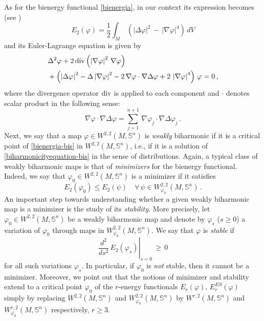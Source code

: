 \documentclass[11pt]{amsart}
\theoremstyle{plain}
\theoremstyle{definition}
\numberwithin{equation}{section}
\def \s{{\mathbb S}}
\numberwithin{equation}{section}
\begin{document}
As for the bienergy functional \eqref{bienergia}, in our context its expression becomes (see \cite{Baird, FS, Saliba})
\begin{equation}\label{bienergia-bis}
    E_2(\varphi)=\frac{1}{2}\int_{M}\,\left (\left |\Delta \varphi \right |^2\,-\,\left |\nabla \varphi \right |^4 \right )\,dV
\end{equation}
and its Euler-Lagrange equation is given by
\begin{equation}\label{biharmonicityequation-bis}
\begin{split}
  &\Delta^2 \varphi +2\,{\rm div} \left ( \left | \nabla \varphi \right |^2\,\nabla \varphi \right ) \\
  &+ \left (\left |\Delta \varphi \right |^2-\Delta \left |\nabla \varphi \right |^2 -2\, \nabla \varphi \cdot  \nabla \Delta \varphi +2\,\left |\nabla \varphi \right |^4\right )\, \varphi =0 \,,
\end{split}
\end{equation}
where the divergence operator ${\rm div}$ is applied to each component and $\cdot$ denotes scalar product in the following sense:
\[
\nabla \varphi \cdot  \nabla \Delta \varphi= \sum_{j=1}^{n+1}\,\nabla \varphi_j \cdot  \nabla \Delta \varphi_j \, .
\]
Next, we say that a map $\varphi \in W^{2,2}\left ( M,\s^n \right )$ is \textit{weakly} biharmonic  if it is a critical point of \eqref{bienergia-bis} in $W^{2,2}\left ( M,\s^n \right )$, i.e., if it is a solution of \eqref{biharmonicityequation-bis} in the sense of distributions. 
Again, a typical class of weakly biharmonic maps is that of {\it minimizers} for the bienergy functional.
Indeed, we say that $\varphi_0 \in W^{2,2}\left ( M,\s^n \right )$ is a minimizer if it satisfies
\[
E_2(\varphi_0) \leq E_2(\psi) \quad \forall \,\psi \in W_{\varphi_0}^{2,2}\left ( M,\s^n \right )\,.
\]
An important step towards understanding whether a given weakly biharmonic map is a minimizer is the study of its \textit{stability}. More precisely, let $\varphi_0 \in W^{2,2}\left ( M,\s^n \right )$ be a weakly biharmonic map and denote by $\varphi_s$ ($s \geq0$) a variation of $\varphi_0$ through maps in $W_{\varphi_0}^{2,2}\left ( M,\s^n \right )$. We say that $\varphi$ is  \textit{stable} if
\begin{equation}\label{second-variation}
 \left . \frac{d^2}{ds^2}\,E_2\left( \varphi_s \right ) \right |_{s=0} \, \geq \, 0
\end{equation}
for all such variations $\varphi_s$. In particular, if $\varphi_0$ is \textit{not} stable, then it cannot be a minimizer. Moreover, we point out that the notions of minimizer and stability extend to a critical point $\varphi_0$ of the $r$-energy functionals $E_r(\varphi)$, $E_r^{ES}(\varphi)$ simply by replacing $W^{2,2}\left ( M,\s^n \right )$ and $W_{\varphi_0}^{2,2}\left ( M,\s^n \right )$ by $W^{r,2}\left ( M,\s^n \right )$ and $W_{\varphi_0}^{r,2}\left ( M,\s^n \right )$ respectively, $r \geq 3$.
\vspace{2mm}
\end{document}
